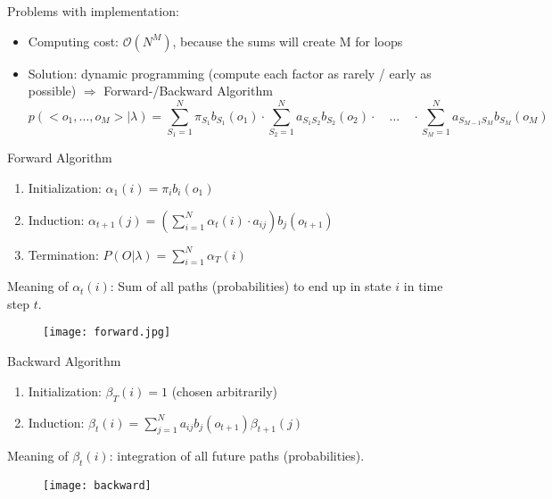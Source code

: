 Problems with implementation:
\begin{itemize}
	\item Computing cost: \(\mathcal{O}\left(N^M\right)\), because the sums will create M for loops
	\item Solution: dynamic programming (compute each factor as rarely / early as possible) $\Rightarrow$ Forward-/Backward Algorithm
	\[p(<o_1,\dots,o_M>|\lambda) = \sum_{S_1=1}^{N} \pi_{S_1} b_{S_1}(o_1) \cdot \sum_{S_2=1}^{N} a_{S_1 S_2} b_{S_2}(o_2) \cdot \quad \ldots \quad \cdot \sum_{S_M=1}^{N} a_{S_{M - 1} S_{M}} b_{S_M}(o_M)\]
\end{itemize}

\begin{algorithm}[H]
\caption{Forward Algorithm}
\begin{enumerate}
    \item Initialization:
        \(\alpha_1(i) = \pi_i b_i(o_1)\)
    \item Induction:
        \(\alpha_{t+1}(j) = \left(\sum_{i=1}^N \alpha_t(i) \cdot a_{ij}\right) b_j(o_{t+1})\)
    \item Termination:
        \(P(O|\lambda) = \sum_{i=1}^N \alpha_T(i)\)
\end{enumerate}
\end{algorithm}

Meaning of $\alpha_t(i)$: Sum of all paths (probabilities) to end up in state $i$ in time step $t$.

\begin{figure}[H]
	\centering
	\texttt{[image: forward.jpg]}
\end{figure}

\begin{algorithm}[H]
\caption{Backward Algorithm}
\begin{enumerate}
    \item Initialization: \(\beta_T (i) = 1\) (chosen arbitrarily)
    \item Induction: \(\beta_t(i) = \sum_{j=1}^N a_{ij} b_j(o_{t+1}) \beta_{t+1}(j)\)
\end{enumerate}
\end{algorithm}
Meaning of $\beta_t(i)$: integration of all future paths (probabilities).

\begin{figure}[H]
  \centering
  \texttt{[image: backward]}
\end{figure}

